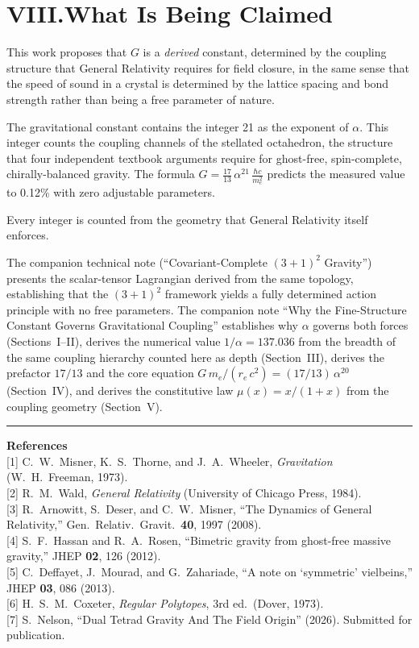 \documentclass[11pt]{article}
\begin{document}
\section*{VIII.\quad What Is Being Claimed}

This work proposes that $G$ is a \emph{derived} constant, determined by the coupling structure that General Relativity requires for field closure, in the same sense that the speed of sound in a crystal is determined by the lattice spacing and bond strength rather than being a free parameter of nature.

The gravitational constant contains the integer 21 as the exponent of $\alpha$.
This integer counts the coupling channels of the stellated octahedron, the structure that four independent textbook arguments require for ghost-free, spin-complete, chirally-balanced gravity.
The formula $G = \frac{17}{13}\,\alpha^{21}\,\frac{\hbar c}{m_e^2}$ predicts the measured value to 0.12\% with zero adjustable parameters.

Every integer is counted from the geometry that General Relativity itself enforces.

The companion technical note (``Covariant-Complete $(3+1)^2$ Gravity'') presents the scalar-tensor Lagrangian derived from the same topology, establishing that the $(3+1)^2$ framework yields a fully determined action principle with no free parameters.
The companion note ``Why the Fine-Structure Constant Governs Gravitational Coupling'' establishes why $\alpha$ governs both forces (Sections~I--II), derives the numerical value $1/\alpha = 137.036$ from the breadth of the same coupling hierarchy counted here as depth (Section~III), derives the prefactor $17/13$ and the core equation $G\,m_e/(r_e\,c^2) = (17/13)\,\alpha^{20}$ (Section~IV), and derives the constitutive law $\mu(x) = x/(1+x)$ from the coupling geometry (Section~V).

\vspace{0.8cm}
\hrule
\vspace{0.5cm}

\small
\textbf{References}\\[4pt]
{[1]} C.~W.~Misner, K.~S.~Thorne, and J.~A.~Wheeler, \textit{Gravitation} (W.~H.~Freeman, 1973).\\
{[2]} R.~M.~Wald, \textit{General Relativity} (University of Chicago Press, 1984).\\
{[3]} R.~Arnowitt, S.~Deser, and C.~W.~Misner, ``The Dynamics of General Relativity,'' Gen.\ Relativ.\ Gravit.\ \textbf{40}, 1997 (2008).\\
{[4]} S.~F.~Hassan and R.~A.~Rosen, ``Bimetric gravity from ghost-free massive gravity,'' JHEP \textbf{02}, 126 (2012).\\
{[5]} C.~Deffayet, J.~Mourad, and G.~Zahariade, ``A note on `symmetric' vielbeins,'' JHEP \textbf{03}, 086 (2013).\\
{[6]} H.~S.~M.~Coxeter, \textit{Regular Polytopes}, 3rd ed.\ (Dover, 1973).\\
{[7]} S.~Nelson, ``Dual Tetrad Gravity And The Field Origin'' (2026).
Submitted for publication.
\end{document}
